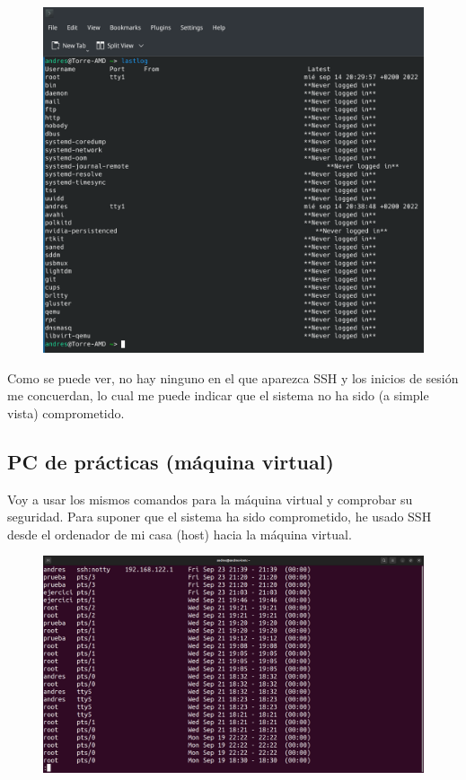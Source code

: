 \documentclass{article}
\begin{document}
\begin{figure}[H]
    \includegraphics[width=\textwidth]{imagenes/lastlogcasa.png}
\end{figure}

Como se puede ver, no hay ninguno en el que aparezca SSH y los inicios de sesión me concuerdan, lo cual me puede indicar que el sistema no ha sido (a simple vista) comprometido.

\newpage

\subsection*{PC de prácticas (máquina virtual)}
Voy a usar los mismos comandos para la máquina virtual y comprobar su seguridad. Para suponer que el sistema ha sido comprometido, he usado SSH desde el ordenador de mi casa (host) hacia la máquina virtual.

\begin{figure}[H]
    \includegraphics[width=\textwidth]{imagenes/lastbip.png}
\end{figure}
\end{document}
